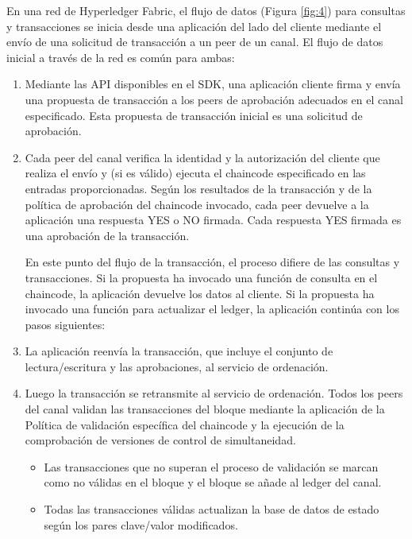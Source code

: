 En una red de Hyperledger Fabric, el flujo de datos (Figura \ref{fig:4}) para consultas y transacciones se inicia desde una aplicación del lado del cliente mediante el envío de una solicitud de transacción a un peer de un canal. El flujo de datos inicial a través de la red es común para ambas:
\begin{enumerate}
	\item Mediante las API disponibles en el SDK, una aplicación cliente firma y envía una propuesta de transacción a los peers de aprobación adecuados en el canal especificado. Esta propuesta de transacción inicial es una solicitud de aprobación.

	\item Cada peer del canal verifica la identidad y la autorización del cliente que realiza el envío y (si es válido) ejecuta el chaincode especificado en las entradas proporcionadas. Según los resultados de la transacción y de la política de aprobación del chaincode invocado, cada peer devuelve a la aplicación una respuesta YES o NO firmada. Cada respuesta YES firmada es una aprobación de la transacción.

	En este punto del flujo de la transacción, el proceso difiere de las consultas y transacciones. Si la propuesta ha invocado una función de consulta en el chaincode, la aplicación devuelve los datos al cliente. Si la propuesta ha invocado una función para actualizar el ledger, la aplicación continúa con los pasos siguientes:

	\item La aplicación reenvía la transacción, que incluye el conjunto de lectura/escritura y las aprobaciones, al servicio de ordenación.
	
	\item Luego la transacción se retransmite al servicio de ordenación. Todos los peers del canal validan las transacciones del bloque mediante la aplicación de la Política de validación específica del chaincode y la ejecución de la comprobación de versiones de control de simultaneidad.
	\begin{itemize}
		\item Las transacciones que no superan el proceso de validación se marcan como no válidas en el bloque y el bloque se añade al ledger del canal.
		\item Todas las transacciones válidas actualizan la base de datos de estado según los pares clave/valor modificados.
	\end{itemize}

\end{enumerate}

